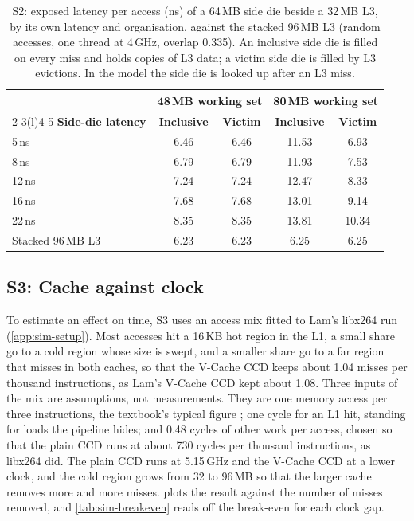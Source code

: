 \begin{table}[htbp]
  \centering
  \caption[S2: a side die against the stacked L3]{S2: exposed latency per access (ns) of a 64\,MB side die beside a 32\,MB L3, by its own latency and organisation, against the stacked 96\,MB L3 (random accesses, one thread at 4\,GHz, overlap 0.335). An inclusive side die is filled on every miss and holds copies of L3 data; a victim side die is filled by L3 evictions. In the model the side die is looked up after an L3 miss.}
  \label{tab:sim-side-die}
  \small
  \begin{tabular}{@{}lcccc@{}}
    \toprule
    & \multicolumn{2}{c}{\textbf{48\,MB working set}} & \multicolumn{2}{c}{\textbf{80\,MB working set}} \\ \cmidrule(lr){2-3}\cmidrule(l){4-5}
    \textbf{Side-die latency} & \textbf{Inclusive} & \textbf{Victim} & \textbf{Inclusive} & \textbf{Victim} \\
    \midrule
    5\,ns & 6.46 & 6.46 & 11.53 & 6.93 \\
    8\,ns & 6.79 & 6.79 & 11.93 & 7.53 \\
    12\,ns & 7.24 & 7.24 & 12.47 & 8.33 \\
    16\,ns & 7.68 & 7.68 & 13.01 & 9.14 \\
    22\,ns & 8.35 & 8.35 & 13.81 & 10.34 \\
    Stacked 96\,MB L3 & 6.23 & 6.23 & 6.25 & 6.25 \\
    \bottomrule
  \end{tabular}
\end{table}

\subsection{S3: Cache against clock}
\label{sec:sim-clock}
To estimate an effect on time, S3 uses an access mix fitted to Lam's libx264 run (\cref{app:sim-setup}). Most accesses hit a 16\,KB hot region in the L1, a small share go to a cold region whose size is swept, and a smaller share go to a far region that misses in both caches, so that the V-Cache CCD keeps about 1.04 misses per thousand instructions, as Lam's V-Cache CCD kept about 1.08. Three inputs of the mix are assumptions, not measurements. They are one memory access per three instructions, the textbook's typical figure \cite[sec.~11.1.1]{sarangi2025basic}; one cycle for an L1 hit, standing for loads the pipeline hides; and 0.48 cycles of other work per access, chosen so that the plain CCD runs at about 730 cycles per thousand instructions, as libx264 did. The plain CCD runs at 5.15\,GHz and the V-Cache CCD at a lower clock, and the cold region grows from 32 to 96\,MB so that the larger cache removes more and more misses.  plots the result against the number of misses removed, and \cref{tab:sim-breakeven} reads off the break-even for each clock gap.

